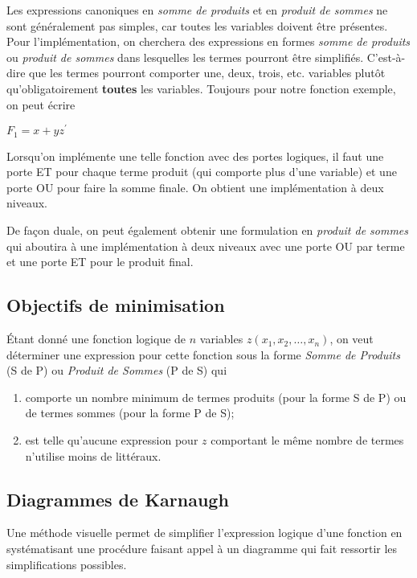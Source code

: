 \documentclass[11pt]{article}
\begin{document}
Les expressions canoniques en \emph{somme de produits} et en \emph{produit de
sommes} ne sont généralement pas simples, car toutes les variables
doivent être présentes. Pour l'implémentation, on cherchera des
expressions en formes \emph{somme de produits} ou \emph{produit de sommes} dans
lesquelles les termes pourront être simplifiés. C'est-à-dire que les
termes pourront comporter une, deux, trois, etc. variables plutôt
qu'obligatoirement \textbf{toutes} les variables. Toujours pour notre
fonction exemple, on peut écrire

\(F_1 = x + y z^\prime\)

Lorsqu'on implémente une telle fonction avec des portes logiques, il
faut une porte ET pour chaque terme produit (qui comporte plus d'une
variable) et une porte OU pour faire la somme finale. On obtient une
implémentation à deux niveaux.

De façon duale, on peut également obtenir une formulation en \emph{produit
de sommes} qui aboutira à une implémentation à deux niveaux avec une
porte OU par terme et une porte ET pour le produit final.


\subsection{Objectifs de minimisation}
\label{sec:org99fd5a9}

Étant donné une fonction logique de \(n\) variables \(z(x_1, x_2, \ldots,
x_n)\), on veut déterminer une expression pour cette fonction sous la
forme \emph{Somme de Produits} (S de P) ou \emph{Produit de Sommes} (P de S) qui

\begin{enumerate}
\item comporte un nombre minimum de termes produits (pour la forme S de P)
ou de termes sommes (pour la forme P de S);

\item est telle qu'aucune expression pour \(z\) comportant le même nombre
de termes n'utilise moins de littéraux.
\end{enumerate}

\subsection{Diagrammes de Karnaugh}
\label{sec:org079ad3a}

Une méthode visuelle permet de simplifier l'expression logique d'une
fonction en systématisant une procédure faisant appel à un diagramme
qui fait ressortir les simplifications possibles.
\end{document}
